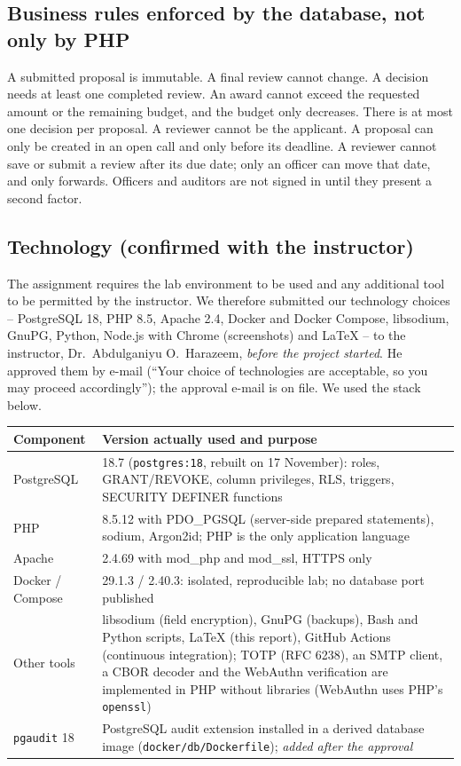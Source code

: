 \documentclass[10pt,a4paper]{article}
\newcommand{\code}[1]{\nolinkurl{#1}}
\newcommand{\tcap}[1]{\captionof{table}{#1}\nopagebreak[4]\vspace{-3pt}}
\begin{document}
\subsection{Business rules enforced by the database, not only by PHP}
A submitted proposal is immutable. A final review cannot change. A decision needs at least one completed review. An award cannot exceed the requested amount or the remaining budget, and the budget only decreases. There is at most one decision per proposal. A reviewer cannot be the applicant. A proposal can only be created in an open call and only before its deadline. A reviewer cannot save or submit a review after its due date; only an officer can move that date, and only forwards. Officers and auditors are not signed in until they present a second factor.

\subsection{Technology (confirmed with the instructor)}
The assignment requires the lab environment to be used and any additional tool to be permitted by the instructor. We therefore submitted our technology choices -- PostgreSQL 18, PHP 8.5, Apache 2.4, Docker and Docker Compose, libsodium, GnuPG, Python, Node.js with Chrome (screenshots) and LaTeX -- to the instructor, Dr.\ Abdulganiyu O.\ Harazeem, \emph{before the project started}. He approved them by e-mail (``Your choice of technologies are acceptable, so you may proceed accordingly''); the approval e-mail is on file. We used the stack below.
\tcap{Technology and versions actually used}
\begin{center}\small
\begin{tabularx}{\linewidth}{@{}L{3.4cm}Y@{}}
\toprule\textbf{Component} & \textbf{Version actually used and purpose}\\\midrule
PostgreSQL & 18.7 (\code{postgres:18}, rebuilt on 17 November): roles, GRANT/REVOKE, column privileges, RLS, triggers, SECURITY DEFINER functions\\
PHP & 8.5.12 with PDO\_PGSQL (server-side prepared statements), sodium, Argon2id; PHP is the only application language\\
Apache & 2.4.69 with mod\_php and mod\_ssl, HTTPS only\\
Docker / Compose & 29.1.3 / 2.40.3: isolated, reproducible lab; no database port published\\
Other tools & libsodium (field encryption), GnuPG (backups), Bash and Python scripts, LaTeX (this report), GitHub Actions (continuous integration); TOTP (RFC 6238), an SMTP client, a CBOR decoder and the WebAuthn verification are implemented in PHP without libraries (WebAuthn uses PHP's \code{openssl})\\
\code{pgaudit} 18 & PostgreSQL audit extension installed in a derived database image (\code{docker/db/Dockerfile}); \emph{added after the approval}\\
\bottomrule\end{tabularx}\end{center}
\end{document}
